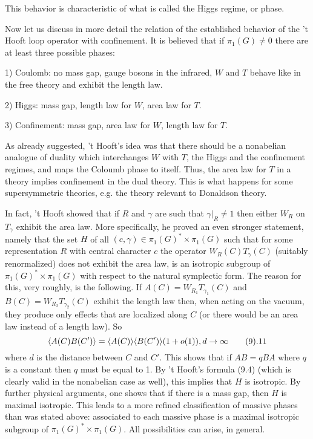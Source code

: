 This behavior is characteristic of what is called  the Higgs regime, or phase. 

Now let us discuss in more detail the relation of 
the established behavior of the 't Hooft loop operator with confinement. 
It is believed that if $\pi_1(G)\ne 0$ there are at least
three possible phases:

1) Coulomb: no mass gap, gauge bosons in the infrared, 
$W$ and $T$ behave like in the free theory and exhibit the length law. 

2) Higgs: mass gap, length law for $W$, area law for $T$.

3) Confinement: mass gap, area law for $W$, length law for $T$.
   
As already suggested,
't Hooft's idea was that there should be a nonabelian analogue of duality 
which interchanges $W$ with $T$, the Higgs and the confinement regimes, 
and maps the Coloumb phase to itself. Thus, the area law for 
$T$ in a theory implies confinement in the dual theory. This is what happens
for some supersymmetric theories, e.g. the theory relevant to
Donaldson theory. 

In fact, 't Hooft showed that if $R$ and $\gamma$ are such that 
$\gamma|_R\ne 1$ then either $W_R$ on $T_\gamma$ exhibit the area law. 
More specifically, he proved an even stronger statement, namely that 
the set $H$ of all $(c,\gamma)\in\pi_1(G)^*\times \pi_1(G)$ such that 
for some representation $R$ with central character $c$ the operator 
$W_R(C)T_\gamma(C)$ (suitably renormalized) does not exhibit the area law,
is an isotropic subgroup of $\pi_1(G)^*\times \pi_1(G)$ 
with respect to the natural symplectic form. The reason for this, very 
roughly, is the following.  If $A(C)=W_{R_1}T_{\gamma_1}(C)$ and $B(C)=
W_{R_2}T_{\gamma_2}(C)$ 
exhibit the length law then, when acting on the vacuum, they produce
only effects that are localized along $C$ (or there would be an area
law instead of a length law).  So
$$
\<A(C)B(C')\>=\<A(C)\>\<B(C')\>(1+o(1)),d\to\infty\tag 9.11
$$ 
where $d$ 
is the distance between $C$ and $C'$. This shows that if $AB=qBA$ 
where $q$ is a constant then $q$ must be equal to 1. 
By 't Hooft's formula (9.4) (which is clearly valid in the 
nonabelian case as well), this implies that $H$ is isotropic.
By further physical arguments, one shows that if there is a mass gap,
then $H$ is maximal isotropic.  This leads to a more refined classification
of massive phases than was stated above: associated to each massive
phase is a maximal isotropic subgroup of $\pi_1(G)^*\times \pi_1(G)$.
All possibilities can arise, in general.

